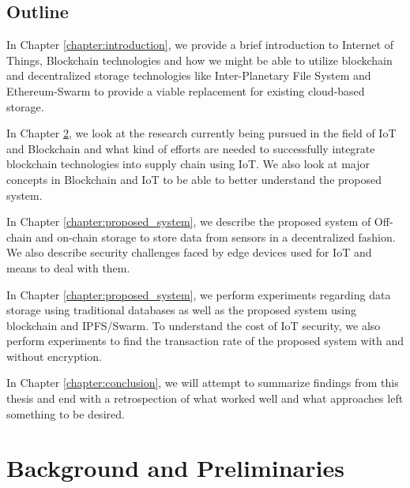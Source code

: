 \documentclass[11pt,openright]{report}
\begin{document}
\section{Outline}\label{section:outline}

In Chapter \ref{chapter:introduction}, we provide a brief introduction to Internet of Things, Blockchain technologies and how we might be able to utilize blockchain and decentralized storage technologies like Inter-Planetary File System and Ethereum-Swarm to provide a viable replacement for existing cloud-based storage.\newline

\noindent In Chapter \ref{chapter:background}, we look at the research currently being pursued in the field of IoT and Blockchain and what kind of efforts are needed to successfully integrate blockchain technologies into supply chain using IoT. We also look at major concepts in Blockchain and IoT to be able to better understand the proposed system.\newline

\noindent In Chapter \ref{chapter:proposed_system}, we describe the proposed system of Off-chain and on-chain storage to store data from sensors in a decentralized fashion. We also describe security challenges faced by edge devices used for IoT and means to deal with them.\newline

\noindent In Chapter \ref{chapter:proposed_system}, we perform experiments regarding data storage using traditional databases as well as the proposed system using blockchain and IPFS/Swarm. To understand the cost of IoT security, we also perform experiments to find the transaction rate of the proposed system with and without encryption.\newline

\noindent In Chapter \ref{chapter:conclusion}, we will attempt to summarize findings from this thesis and end with a retrospection of what worked well and what approaches left something to be desired.\newline 



\chapter{Background and Preliminaries} \label{chapter:background}
\end{document}
